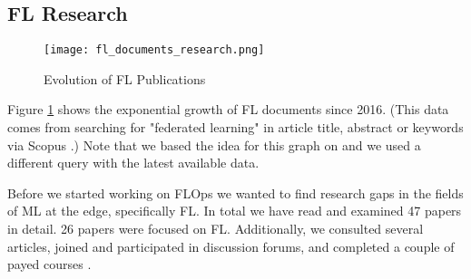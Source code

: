 %
%
%
\subsection{FL Research}\label{subsection:fl_research}

\begin{figure}[h]
    \centering
    \texttt{[image: fl\_documents\_research.png]}
    \caption{Evolution of FL Publications}
    \label{fig:fl_documents_research}
\end{figure}

Figure \ref{fig:fl_documents_research} shows the exponential growth of FL documents
since 2016. (This data comes from searching for "federated learning" in article title, abstract or keywords via Scopus \cite{scopus_homepage}.)
Note that we based the idea for this graph on \cite{thesis:tum_fl_framework_comparison}
and we used a different query with the latest available data.

Before we started working on FLOps we wanted to find research gaps in the fields of 
ML at the edge, specifically FL.
In total we have read and examined 47 papers in detail. 
26 papers were focused on FL. 
Additionally, we consulted several articles,
joined and participated in discussion forums,
and completed a couple of payed courses \cite{udemy_homepage}.






